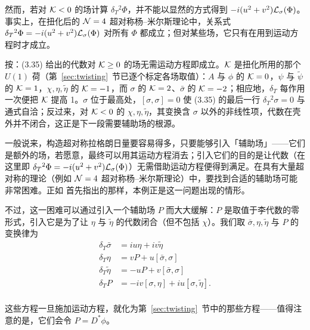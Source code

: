 然而，若对 ${\mathcal{K}}<0$ 的场计算 $\delta_T{}^2\Phi$，并不能以显然的方式得到 $-i(u^2+v^2){{{\mathcal{L}}}}_\sigma(\Phi)$。事实上，在扭化后的 ${{\mathcal{N}}}=4$ 超对称杨--米尔斯理论中，关系式 $\delta_T{}^2\Phi=-i(u^2+v^2){{{\mathcal{L}}}}_\sigma(\Phi)$ 对所有 $\Phi$ 都成立；但对某些场，它只有在用到运动方程时才成立。

\begin{yizhu}[易错点]
按：(3.35) 给出的代数对 ${\mathcal{K}}\geq 0$ 的场无需运动方程即成立。${\mathcal{K}}$ 是扭化所用的那个 $U(1)$ 荷（第~\ref{sec:twisting}~节已逐个标定各场取值）：$A$ 与 $\phi$ 的 ${\mathcal{K}}=0$，$\psi$ 与 $\tilde\psi$ 的 ${\mathcal{K}}=1$，$\chi,\eta,\tilde\eta$ 的 ${\mathcal{K}}=-1$，而 $\sigma$ 的 ${\mathcal{K}}=2$、$\bar\sigma$ 的 ${\mathcal{K}}=-2$；相应地，$\delta_T$ 每作用一次便把 ${\mathcal{K}}$ 提高 1。$\sigma$ 位于最高处，$[\sigma,\sigma]=0$ 使 (3.35) 的最后一行 $\delta_T{}^2\sigma=0$ 与通式自洽；反过来，对 ${\mathcal{K}}<0$ 的 $\chi,\eta,\tilde\eta$，其变换含 $\sigma$ 以外的非线性项，代数在壳外并不闭合，这正是下一段需要辅助场的根源。
\end{yizhu}

一般说来，构造超对称拉格朗日量要容易得多，只要能够引入「辅助场」——它们是额外的场，若愿意，最终可以用其运动方程消去；引入它们的目的是让代数（在这里即 $\delta_T{}^2\Phi=-i(u^2+v^2){{{\mathcal{L}}}}_\sigma(\Phi)$）无需借助运动方程便得到满足。在具有大量超对称的理论（例如 ${{\mathcal{N}}}=4$ 超对称杨--米尔斯理论）中，要找到合适的辅助场可能非常困难。正如 \cite{ref53} 首先指出的那样，本例正是这一问题出现的情形。

不过，这一困难可以通过引入一个辅助场 $P$ 而大大缓解：$P$ 是取值于李代数的零形式，引入它是为了让 $\eta$ 与 $\tilde\eta$ 的代数闭合（但不包括 $\chi$）。我们取 $\bar\sigma,\eta,\tilde\eta$ 与 $P$ 的变换律为
\setcounter{equation}{36}
\begin{equation}\label{eq:yfog}
\begin{aligned}\delta_T\bar\sigma & = iu\eta +i v\tilde\eta
\\
                    \delta_T\eta & = vP+u[\bar\sigma,\sigma]\\
                    \delta_T\tilde\eta & =
                    -uP+v[\bar\sigma,\sigma]\\
                    \delta_T P & =
                    -iv[\sigma,\eta]+i u[\sigma,\tilde\eta].\\\end{aligned}
\end{equation}

这些方程一旦施加运动方程，就化为第~\ref{sec:twisting}~节中的那些方程——值得注意的是，它们会令 $P=D^*\phi$。

